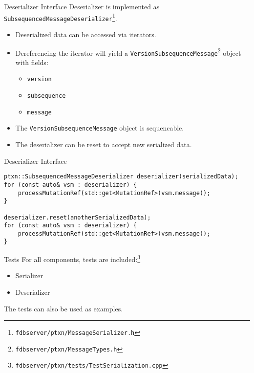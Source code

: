 \documentclass[9pt]{beamer}
\begin{document}
    \begin{frame}{Deserializer Interface}
        Deserializer is implemented as \texttt{SubsequencedMessageDeserializer}\footnote{\texttt{fdbserver/ptxn/MessageSerializer.h}}.
        \begin{itemize}
            \item Deserialized data can be accessed via iterators.
            \item Dereferencing the iterator will yield a \texttt{VersionSubsequenceMessage}\footnote{\texttt{fdbserver/ptxn/MessageTypes.h}} object with fields:
            \begin{itemize}
                \item \texttt{version}
                \item \texttt{subsequence}
                \item \texttt{message}
            \end{itemize}
            \item The \texttt{VersionSubsequenceMessage} object is sequencable.
            \item The deserializer can be reset to accept new serialized data.
        \end{itemize}
    \end{frame}

    \begin{frame}[fragile]{Deserializer Interface}
        \begin{lstlisting}
ptxn::SubsequencedMessageDeserializer deserializer(serializedData);
for (const auto& vsm : deserializer) {
    processMutationRef(std::get<MutationRef>(vsm.message));
}

deserializer.reset(anotherSerializedData);
for (const auto& vsm : deserializer) {
    processMutationRef(std::get<MutationRef>(vsm.message));
}
        \end{lstlisting}
    \end{frame}

    \begin{frame}{Tests}
        For all components, tests are included:\footnote{\texttt{fdbserver/ptxn/tests/TestSerialization.cpp}}
        \begin{itemize}
            \item Serializer
            \item Deserializer
        \end{itemize}
        The tests can also be used as examples.
    \end{frame}
\end{document}
